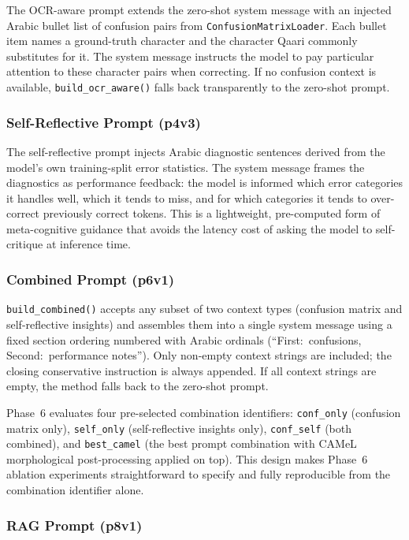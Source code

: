 The OCR-aware prompt extends the zero-shot system message with an injected
Arabic bullet list of confusion pairs from \texttt{ConfusionMatrixLoader}.
Each bullet item names a ground-truth character and the character Qaari commonly
substitutes for it.
The system message instructs the model to pay particular attention to these
character pairs when correcting.
If no confusion context is available, \texttt{build\_ocr\_aware()} falls back
transparently to the zero-shot prompt.

\subsubsection{Self-Reflective Prompt (p4v3)}

The self-reflective prompt injects Arabic diagnostic sentences derived from the
model's own training-split error statistics.
The system message frames the diagnostics as performance feedback:
the model is informed which error categories it handles well, which it tends to
miss, and for which categories it tends to over-correct previously correct tokens.
This is a lightweight, pre-computed form of meta-cognitive guidance that avoids
the latency cost of asking the model to self-critique at inference time.

\subsubsection{Combined Prompt (p6v1)}

\texttt{build\_combined()} accepts any subset of two context types
(confusion matrix and self-reflective insights) and assembles them into a single
system message using a fixed section ordering numbered with Arabic ordinals
(``First:\ confusions, Second:\ performance notes'').
Only non-empty context strings are included; the closing conservative instruction
is always appended.
If all context strings are empty, the method falls back to the zero-shot prompt.

Phase~6 evaluates four pre-selected combination identifiers:
\texttt{conf\_only} (confusion matrix only),
\texttt{self\_only} (self-reflective insights only),
\texttt{conf\_self} (both combined), and
\texttt{best\_camel} (the best prompt combination with CAMeL morphological
post-processing applied on top).
This design makes Phase~6 ablation experiments straightforward to specify and
fully reproducible from the combination identifier alone.

\subsubsection{RAG Prompt (p8v1)}


